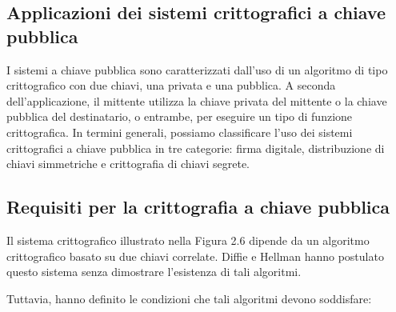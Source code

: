 \subsection{Applicazioni dei sistemi crittografici a chiave pubblica}
I sistemi a chiave pubblica sono caratterizzati dall'uso di un algoritmo di tipo crittografico con due chiavi, una privata e una pubblica. A seconda dell'applicazione, il mittente utilizza la chiave privata del mittente o la chiave pubblica del destinatario, o entrambe, per eseguire un tipo di funzione crittografica. In termini generali, possiamo classificare l'uso dei sistemi crittografici a chiave pubblica in tre categorie: firma digitale, distribuzione di chiavi simmetriche e crittografia di chiavi segrete.

\newpage
\subsection{Requisiti per la crittografia a chiave pubblica}
Il sistema crittografico illustrato nella Figura 2.6 dipende da un algoritmo crittografico
basato su due chiavi correlate. Diffie e Hellman hanno postulato questo sistema senza dimostrare l'esistenza di tali algoritmi.

\singlespacing

Tuttavia, hanno definito le condizioni che tali algoritmi devono soddisfare:

